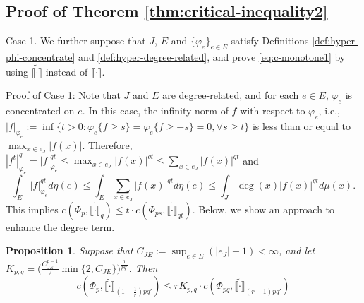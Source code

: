 \documentclass[12pt,a4paper]{article}
\newtheorem{prop}[theorem]{Proposition}
\begin{document}
\subsection{Proof of Theorem \ref{thm:critical-inequality2}}



Case 1. %
We further suppose that $J$, $E$ and $\{\varphi_e\}_{e\in E}$  satisfy Definitions \ref{def:hyper-phi-concentrate} and  \ref{def:hyper-degree-related}, and prove  \eqref{eq:c-monotone1} by using $\widetilde{\llbracket \cdot\rrbracket}$ instead of $\llbracket \cdot\rrbracket$.

\noindent Proof of Case 1: 
Note that $J$ and $E$ are degree-related, and for each $e\in E$, $\varphi_e$ is concentrated on $e$. 
In this case, the infinity norm of $f$ with respect to $\varphi_e$, i.e.,  $|f|_{\varphi_e}:=\inf \big\{t>0: \varphi_e\{f\ge s\}=\varphi_e\{f\ge -s\}=0,\forall s\ge t\big\}$ is less than or equal to $\max_{x\in e_J}|f(x)|$. Therefore, $|f^t|_{\varphi_e}^{q}=|f|_{\varphi_e}^{qt}\le \max_{x\in e_J}|f(x)|^{qt}\le \sum_{x\in e_J}|f(x)|^{qt}$ and $$\int_E|f|_{\varphi_e}^{qt}d\eta(e)\le \int_E\sum_{x\in e_J}|f(x)|^{qt}d\eta(e)\le\int_J\deg(x)|f(x)|^{qt}d\mu(x).$$  
This implies $c(\Phi_p,\widetilde{\llbracket \cdot\rrbracket}_{q})\le t\cdot  c(\Phi_{ps},\widetilde{\llbracket \cdot\rrbracket}_{qt})$. Below, we show an approach to enhance the degree term. 




\begin{prop}\label{pro:phi-rKcpq}
Suppose that $C_{JE}:=\sup_{e\in E}(|e_J|-1)<\infty$, and let $K_{p,q}=\big(\frac{C_{JE}^{p-1}}{2}\min \{2,C_{JE}\}\big)^{\frac{1}{pq'}}$. Then
$$c(\Phi_p,\widetilde{\llbracket \cdot\rrbracket}_{  (1-\frac1r)pq' })\le r   K_{p,q}\cdot  c(\Phi_{pq},\widetilde{\llbracket \cdot\rrbracket}_{(r-1)pq'})$$ 
\end{prop}
\end{document}
